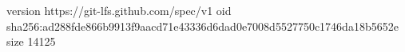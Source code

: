 version https://git-lfs.github.com/spec/v1
oid sha256:ad288fde866b9913f9aacd71e43336d6dad0e7008d5527750c1746da18b5652e
size 14125
